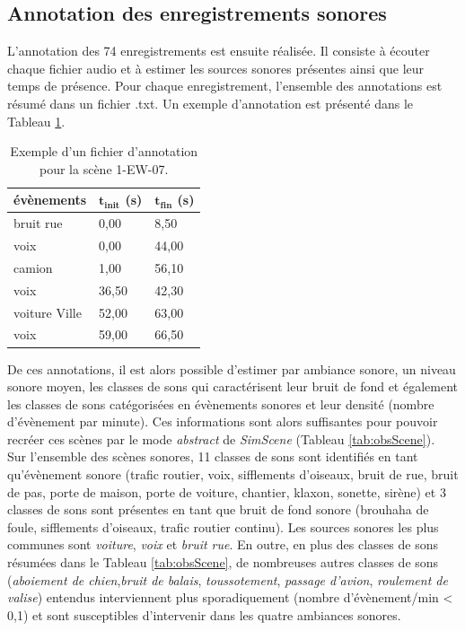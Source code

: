 \subsection{Annotation des enregistrements sonores}\label{part:scene_annotation}

L'annotation des 74 enregistrements est ensuite réalisée. Il consiste à écouter chaque fichier audio et à estimer les sources sonores présentes ainsi que leur temps de présence. Pour chaque enregistrement, l'ensemble des annotations est résumé dans un fichier .txt. Un exemple d'annotation est présenté dans le Tableau \ref{tab:exemple_annotation}.\\

\begin{table}[t]
\centering
\begin{tabular}{lll}
\toprule
\textbf{évènements}    & $\mathbf{t_{init}}$ \textbf{(s)} & $\mathbf{t_{fin}}$ \textbf{(s)} \\ \midrule
bruit rue     & 0,00            & 8,50           \\ 
voix          & 0,00            & 44,00          \\ 
camion        & 1,00            & 56,10          \\ 
voix          & 36,50           & 42,30          \\ 
voiture Ville & 52,00          & 63,00          \\ 
voix          & 59,00           & 66,50         \\ \bottomrule
\end{tabular}
\caption{Exemple d'un fichier d'annotation pour la scène 1-EW-07.}
\label{tab:exemple_annotation}
\end{table}


De ces annotations, il est alors possible d'estimer par ambiance sonore, un niveau sonore moyen, les classes de sons qui caractérisent leur bruit de fond et également les classes de sons catégorisées en évènements sonores et leur densité (nombre d'évènement par minute). Ces informations sont alors suffisantes pour pouvoir recréer ces scènes par le mode \textit{abstract} de \textit{SimScene} (Tableau \ref{tab:obsScene}). \\



Sur l'ensemble des scènes sonores, 11 classes de sons sont identifiés en tant qu'évènement sonore (trafic routier, voix, sifflements d'oiseaux, bruit de rue, bruit de pas, porte de maison, porte de voiture, chantier, klaxon, sonette, sirène) et 3 classes de sons sont présentes en tant que bruit de fond sonore (brouhaha de foule, sifflements d'oiseaux, trafic routier continu).
Les sources sonores les plus communes sont \textit{voiture}, \textit{voix} et \textit{bruit rue}. En outre, en plus des classes de sons résumées dans le Tableau \ref{tab:obsScene}, de nombreuses autres classes de sons (\textit{aboiement de chien},\textit{bruit de balais}, \textit{toussotement}, \textit{passage d'avion}, \textit{roulement de valise}) entendus interviennent plus sporadiquement (nombre d'évènement/min < 0,1) et sont susceptibles d'intervenir dans les quatre ambiances sonores.

